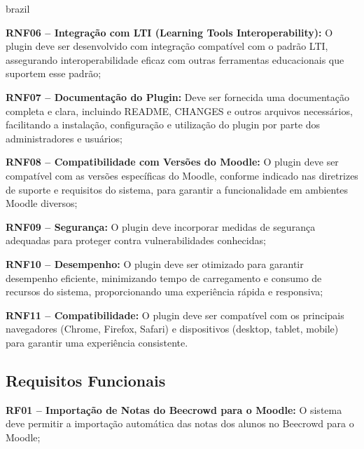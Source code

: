 \begin{otherlanguage*}{brazil}
\vspace{12pt}

\textbf{RNF06 – Integração com LTI (Learning Tools Interoperability):} O plugin deve ser desenvolvido com integração compatível com o padrão LTI, assegurando interoperabilidade eficaz com outras ferramentas educacionais que suportem esse padrão;

\vspace{12pt}

\textbf{RNF07 – Documentação do Plugin:} Deve ser fornecida uma documentação completa e clara, incluindo README, CHANGES e outros arquivos necessários, facilitando a instalação, configuração e utilização do plugin por parte dos administradores e usuários;

\vspace{12pt}

\textbf{RNF08 – Compatibilidade com Versões do Moodle:} O plugin deve ser compatível com as versões específicas do Moodle, conforme indicado nas diretrizes de suporte e requisitos do sistema, para garantir a funcionalidade em ambientes Moodle diversos;

\vspace{12pt}

\textbf{RNF09 – Segurança:} O plugin deve incorporar medidas de segurança adequadas para proteger contra vulnerabilidades conhecidas;

\vspace{12pt}

\textbf{RNF10 – Desempenho:} O plugin deve ser otimizado para garantir desempenho eficiente, minimizando tempo de carregamento e consumo de recursos do sistema, proporcionando uma experiência rápida e responsiva;

\vspace{12pt}

\textbf{RNF11 – Compatibilidade:} O plugin deve ser compatível com os principais navegadores (Chrome, Firefox, Safari) e dispositivos (desktop, tablet, mobile) para garantir uma experiência consistente.

\subsection{Requisitos Funcionais}

\textbf{RF01 – Importação de Notas do Beecrowd para o Moodle:} O sistema deve permitir a importação automática das notas dos alunos no Beecrowd para o Moodle;

\vspace{12pt}


\end{otherlanguage*}
